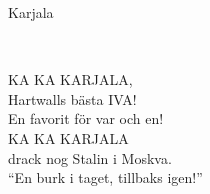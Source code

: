 \begin{song}{Karjala}
	
	\\
	
	KA KA KARJALA,\\
	Hartwalls bästa IVA!\\
	En favorit för var och en!\\
	KA KA KARJALA\\
	drack nog Stalin i Moskva.\\
	``En burk i taget, tillbaks igen!''
	
\end{song}
